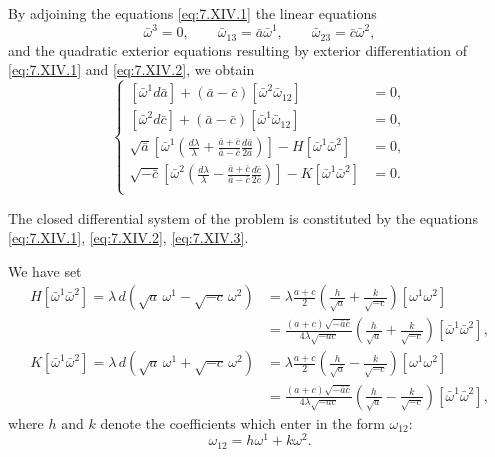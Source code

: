 \documentclass[leqno,11pt]{book}
\numberwithin{equation}{chapter}
\theoremstyle{shape1}
\theoremstyle{shape0}
\theoremstyle{shape2}
\theoremstyle{definition}
\begin{document}
By adjoining the equations \eqref{eq:7.XIV.1} the linear equations
\begin{equation}
  \label{eq:7.XIV.2}\tag{XIV, 2}
  \bar\omega^{3}=0,\qquad\bar\omega_{13}=\bar a \bar\omega^{1},\qquad\bar\omega_{23}=\bar c\bar\omega^{2},
\end{equation}
and the quadratic exterior equations resulting by exterior differentiation of \eqref{eq:7.XIV.1} and \eqref{eq:7.XIV.2}, we obtain
\begin{equation}
  \label{eq:7.XIV.3}\tag{XIV, 3}
  \left\{
    \begin{aligned}{}
      [\bar\omega^{1}d\bar a]+(\bar a-\bar c)[\bar\omega^{2}\bar\omega_{12}]&=0,\\
      [\bar\omega^{2}d\bar c]+(\bar a-\bar c)[\bar \omega^{1}\bar \omega_{12}]&=0,\\
      \sqrt{\bar a}\left[\bar\omega^{1}\left(\frac{d\lambda}{\lambda}+\frac{\bar a+\bar c}{\bar a-\bar c}\frac{d\bar a}{2\bar a}\right)\right]-H[\bar \omega^{1}\bar \omega^{2}]&=0,\\
      \sqrt{-\bar c}\left[\bar\omega^{2}\left(\frac{d\lambda}{\lambda}-\frac{\bar a+\bar c}{\bar a-\bar c}\frac{d\bar c}{2\bar c}\right)\right]-K[\bar \omega^{1}\bar \omega^{2}]&=0.\\
    \end{aligned}
  \right.
\end{equation}

The closed differential system of the problem is constituted by the equations \eqref{eq:7.XIV.1}, \eqref{eq:7.XIV.2}, \eqref{eq:7.XIV.3}.

We have set
\begin{align*}
  H[\bar\omega^{1}\bar\omega^{2}]=\lambda\, d(\sqrt{a}\,\omega^{1}-\sqrt{-c}\,\omega^{2})&=\lambda\frac{a+c}{2}\left(\frac{h}{\sqrt{a}}+\frac{k}{\sqrt{-c}}\right)[\omega^{1}\omega^{2}]\\
  &=\frac{(a+c)\sqrt{-\bar{a}\bar{c}}}{4\lambda\sqrt{-ac}}\left(\frac{h}{\sqrt{a}}+\frac{k}{\sqrt{-c}}\right)[\bar\omega^{1}\bar\omega^{2}],\\
  K[\bar\omega^{1}\bar\omega^{2}]=\lambda\, d(\sqrt{a}\,\omega^{1}+\sqrt{-c}\,\omega^{2})&=\lambda\frac{a+c}{2}\left(\frac{h}{\sqrt{a}}-\frac{k}{\sqrt{-c}}\right)[\omega^{1}\omega^{2}]\\
  &=\frac{(a+c)\sqrt{-\bar{a}\bar{c}}}{4\lambda\sqrt{-ac}}\left(\frac{h}{\sqrt{a}}-\frac{k}{\sqrt{-c}}\right)[\bar\omega^{1}\bar\omega^{2}],
\end{align*}
where $h$ and $k$ denote the coefficients which enter in the form $\omega_{12}$:
\[
\omega_{12}=h\omega^{1}+k\omega^{2}.
\]
\end{document}
